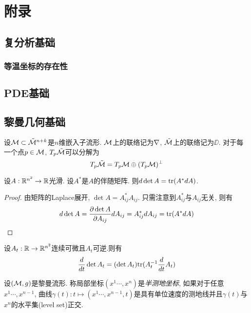 \appendix
\appendix
\chapter{附录}
\section{复分析基础}
\subsection{等温坐标的存在性}
\section{PDE基础}
\section{黎曼几何基础}
设${\mathcal{M}}\subset {\tilde{\mathcal{M}}}^{n+k}$是$n$维嵌入子流形. ${\mathcal{M}}$上的联络记为${\nabla}$, ${\tilde{\mathcal{M}}}$上的联络记为$\DD$. 对于每一个点$p \in {\mathcal{M}}$, $T_p{\tilde{\mathcal{M}}}$可以分解为
\begin{equation}
    T_p{\tilde{\mathcal{M}}}=T_p{\mathcal{M}} \oplus  (T_p{\mathcal{M}})^{\perp}
\end{equation}
\begin{lemma}
    设$A: \mathbb{R}^{n^2} \to \mathbb{R}$光滑. 设$A^*$是$A$的伴随矩阵. 则$d\det A={\text{tr}}(A^*dA)$.
\end{lemma}
\begin{proof}
    由矩阵的Laplace展开, $\det A=A^*_{ij}A_{ij}$. 只需注意到$A^*_{ij}$与$A_{ij}$无关, 则有
    \begin{equation}
        d\det A= \frac{{\partial} \det A}{{\partial} A_{ij}}dA_{ij}=A^*_{ij}dA_{ij}={\text{tr}}(A^*dA)
    \end{equation}
\end{proof}
\begin{corollary}
    设$A_t: \mathbb{R} \to \mathbb{R}^{n^2}$连续可微且$A_t$可逆.则有
    \begin{equation}
        \frac{d}{dt}\det A_t=(\det A_t){\text{tr}}(A^{-1}_t\frac{d}{dt}A_t)
    \end{equation}
\end{corollary}
\begin{definition}
    设$({\mathcal{M}},g)$是黎曼流形.  称局部坐标$(x^1\cdots, x^n)$是\textit{半测地坐标}, 如果对于任意$x^1\cdots, x^{n-1}$, 曲线$\gamma(t): t \mapsto (x^1\cdots,x^{n-1},t)$是具有单位速度的测地线并且$\gamma(t)$与$x^n$的水平集(level set)正交.
\end{definition}
